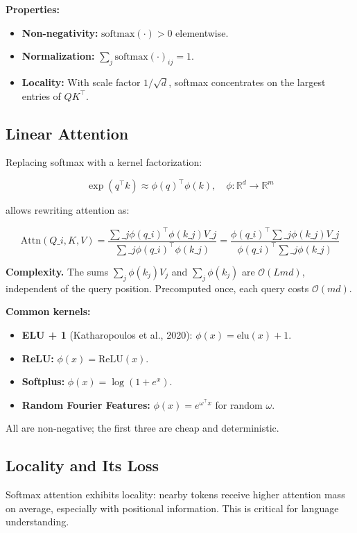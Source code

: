 \textbf{Properties:}
\begin{itemize}
\item \textbf{Non-negativity:} $\text{softmax}(\cdot) > 0$ elementwise.
\item \textbf{Normalization:} $\sum_j \text{softmax}(\cdot)_{ij} = 1$.
\item \textbf{Locality:} With scale factor $1/\sqrt{d}$, softmax concentrates on
  the largest entries of $QK^\top$.

\end{itemize}
\subsection{Linear Attention}

Replacing softmax with a kernel factorization:

\[
\exp(q^\top k) \approx \phi(q)^\top \phi(k), \quad \phi: \mathbb{R}^d \to \mathbb{R}^m
\]

allows rewriting attention as:

\[
\text{Attn}(Q\_i, K, V) = \frac{\sum\_j \phi(q\_i)^\top \phi(k\_j) V\_j}{\sum\_j \phi(q\_i)^\top \phi(k\_j)} = \frac{\phi(q\_i)^\top \sum\_j \phi(k\_j) V\_j}{\phi(q\_i)^\top \sum\_j \phi(k\_j)}
\]

\textbf{Complexity.} The sums $\sum_j \phi(k_j) V_j$ and $\sum_j \phi(k_j)$ are 
$\mathcal{O}(L m d)$, independent of the query position. Precomputed once, 
each query costs $\mathcal{O}(m d)$.

\textbf{Common kernels:}
\begin{itemize}
\item \textbf{ELU + 1} (Katharopoulos et al., 2020): $\phi(x) = \text{elu}(x) + 1$.
\item \textbf{ReLU:} $\phi(x) = \text{ReLU}(x)$.
\item \textbf{Softplus:} $\phi(x) = \log(1 + e^x)$.
\item \textbf{Random Fourier Features:} $\phi(x) = e^{\omega^\top x}$ for random
  $\omega$.

\end{itemize}
All are non-negative; the first three are cheap and deterministic.

\subsection{Locality and Its Loss}

Softmax attention exhibits locality: nearby tokens receive higher attention 
mass on average, especially with positional information. This is critical 
for language understanding.

